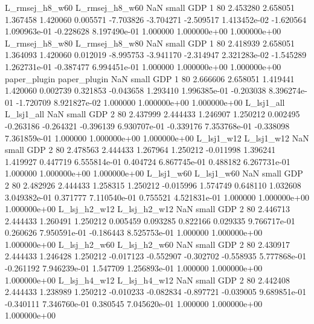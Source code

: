 L_rmsej_h8_w60 L_rmsej_h8_w60                   NaN      small      GDP                 1 80 2.453280       2.658051 1.367458       1.420060    0.005571     -7.703826     -3.704271    -2.509517   1.413452e-02 -1.620564 1.090963e-01    -0.228628   8.197490e-01            1.000000    1.000000e+00        1.000000e+00
L_rmsej_h8_w80 L_rmsej_h8_w80                   NaN      small      GDP                 1 80 2.418939       2.658051 1.364093       1.420060    0.012019     -8.995753     -3.941170    -2.314947   2.321283e-02 -1.545289 1.262731e-01    -0.387477   6.994451e-01            1.000000    1.000000e+00        1.000000e+00
  paper_plugin   paper_plugin                   NaN      small      GDP                 1 80 2.666606       2.658051 1.419441       1.420060    0.002739      0.321853     -0.043658     1.293410   1.996385e-01 -0.203038 8.396274e-01    -1.720709   8.921827e-02            1.000000    1.000000e+00        1.000000e+00
    L_lsj1_all     L_lsj1_all                   NaN      small      GDP                 2 80 2.437999       2.444433 1.246907       1.250212    0.002495     -0.263186     -0.264321    -0.396139   6.930707e-01 -0.339176 7.353768e-01    -0.338098   7.361859e-01            1.000000    1.000000e+00        1.000000e+00
    L_lsj1_w12     L_lsj1_w12                   NaN      small      GDP                 2 80 2.478563       2.444433 1.267964       1.250212   -0.011998      1.396241      1.419927     0.447719   6.555814e-01  0.404724 6.867745e-01     0.488182   6.267731e-01            1.000000    1.000000e+00        1.000000e+00
    L_lsj1_w60     L_lsj1_w60                   NaN      small      GDP                 2 80 2.482926       2.444433 1.258315       1.250212   -0.015996      1.574749      0.648110     1.032608   3.049382e-01  0.371777 7.110540e-01     0.755521   4.521831e-01            1.000000    1.000000e+00        1.000000e+00
  L_lsj_h2_w12   L_lsj_h2_w12                   NaN      small      GDP                 2 80 2.446713       2.444433 1.260491       1.250212    0.005459      0.093285      0.822166     0.029335   9.766717e-01  0.260626 7.950591e-01    -0.186443   8.525753e-01            1.000000    1.000000e+00        1.000000e+00
  L_lsj_h2_w60   L_lsj_h2_w60                   NaN      small      GDP                 2 80 2.430917       2.444433 1.246428       1.250212   -0.017123     -0.552907     -0.302702    -0.558935   5.777868e-01 -0.261192 7.946239e-01     1.547709   1.256893e-01            1.000000    1.000000e+00        1.000000e+00
  L_lsj_h4_w12   L_lsj_h4_w12                   NaN      small      GDP                 2 80 2.442408       2.444433 1.238989       1.250212   -0.010233     -0.082834     -0.897721    -0.039005   9.689851e-01 -0.340111 7.346760e-01     0.380545   7.045620e-01            1.000000    1.000000e+00        1.000000e+00
